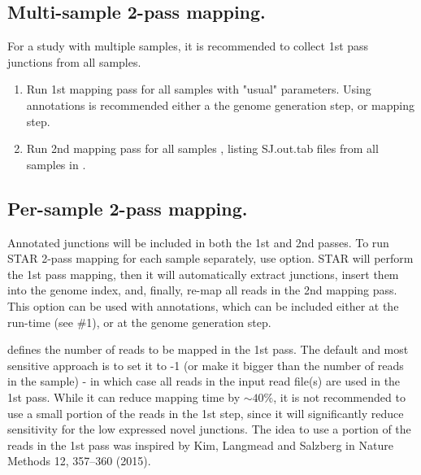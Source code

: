 \documentclass[12pt]{article}
\begin{document}
\subsection{Multi-sample 2-pass mapping.}
For a study with multiple samples, it is recommended to collect 1st pass junctions from all samples.
\begin{enumerate}
\item Run 1st mapping pass for all samples with "usual" parameters. Using annotations is recommended either a the genome generation step, or mapping step.
\item Run 2nd mapping pass for all samples , listing SJ.out.tab files from all samples in  .
\end{enumerate}

\subsection{Per-sample 2-pass mapping.}
   
Annotated junctions will be included in both the 1st and 2nd passes.
To run STAR 2-pass mapping for each sample separately, use   option. STAR will perform the 1st pass mapping, then it will automatically extract junctions, insert them into the genome index, and, finally, re-map all reads in the 2nd mapping pass. This option can be used with annotations, which can be included either at the run-time (see \#1), or at the genome generation step.

 defines the number of reads to be mapped in the 1st pass. The default and most sensitive approach is to set it to -1 (or make it bigger than the number of reads in the sample) - in which case all reads in the input read file(s) are used in the 1st pass. While it can reduce mapping time by $\sim40\%$, it is not recommended to use a small portion of the reads in the 1st step, since it will significantly reduce sensitivity for the low expressed novel junctions. The idea to use a portion of the reads in the 1st pass was inspired by Kim, Langmead and Salzberg in Nature Methods 12, 357–360 (2015).
\end{document}
